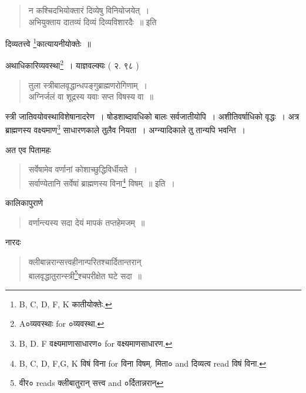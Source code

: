 \documentclass[11pt, openany]{book}
\begin{document}
\begin{quote}
{\vy न कश्चिदभियोक्तारं दिव्येषु विनियोजयेत्~।\\
अभियुक्ताय दातव्यं दिव्यं दिव्यविशारदैः~॥} इति
\end{quote}

\noindent
दिव्यतत्त्वे \renewcommand{\thefootnote}{2}\footnote{B, C, D, F, K कातीयोक्तेः.}कात्यायनीयोक्तेः~॥

अथाधिकारिव्यवस्था\renewcommand{\thefootnote}{3}\footnote{A०व्यवस्थाः for ०व्यवस्था.}~। याज्ञवल्क्यः ( २. ९८ )

\begin{quote}
{\vy तुला स्त्रीबालवृद्धान्धपङ्गुब्राह्मणरोगिणाम्~।\\
अग्निर्जलं वा शूद्रस्य यवाः सप्त विषस्य वा~॥}
\end{quote}

स्त्री जातिवयोवस्थाविशेषानादरेण~। षोडशाब्दावधिको बालः सर्वजातीयोपि~। अशीतिवर्षाधिको वृद्धः~। अत्र ब्राह्मणस्य वक्ष्यमाण\renewcommand{\thefootnote}{4}\footnote{B, D. F वक्ष्यमाणासाधारण० for वक्ष्यमाणसाधारण.} साधारणकाले तुलैव नियता~। अग्न्यादिकाले तु तान्यपि भवन्ति~।

अत एव पितामहः
\begin{quote}
{\vy सर्वेषामेव वर्णानां कोशाच्छुद्धिविर्धीयते~।\\
सर्वाण्येतानि सर्वेषां ब्राह्मणस्य विना\renewcommand{\thefootnote}{5}\footnote{B, C, D, F,G, K विषं विना for विना विषम्. मिता० and दिव्यत्व read विषं विना.} विषम्~॥} इति~।
\end{quote}

कालिकापुराणे

\begin{quote}
{\vy वर्णान्त्यस्य सदा देयं मापकं तप्तहेमजम्~॥}
\end{quote}

नारदः 

\begin{quote}
{\vy क्लीबान्नरान्सत्त्वहीनान्परितश्चार्दितान्तरान्\\
बालवृद्धातुरान्स्त्री\renewcommand{\thefootnote}{6}\footnote{वीर० reads क्लीबातुरान् सत्त्व and ०र्दितान्नरान्}श्चपरीक्षेत घटे सदा~॥}
\end{quote}

\newpage 
{}
\end{document}
